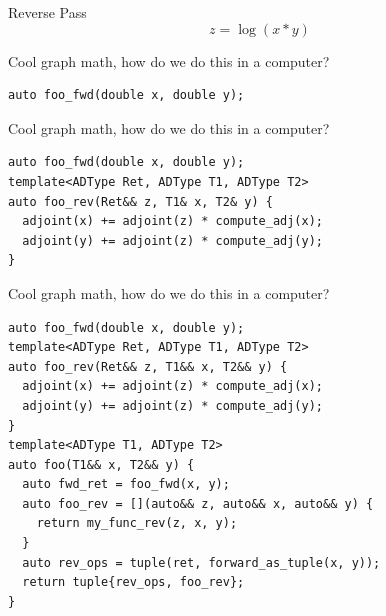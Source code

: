 \documentclass[dvipsnames]{beamer}
\makeatletter
\def\mathcolor#1#{\@mathcolor{#1}}
\def\@mathcolor#1#2#3{%
  \protect\leavevmode
  \begingroup
    \color#1{#2}#3%
  \endgroup
}
\newcommand{\pp}[2]{\frac{\partial#1}{\partial#2}}
\newcommand{\adj}[1]{\bar{#1}}
\makeatother
\begin{document}
\begin{frame}{Reverse Pass}
\vspace{-1mm}
$$z = \log(x*y)$$
\end{frame}


\begin{frame}[fragile]{Cool graph math, how do we do this in a computer?}
\begin{verbatim}
auto foo_fwd(double x, double y);
\end{verbatim}
\end{frame}

\begin{frame}[fragile]{Cool graph math, how do we do this in a computer?}
\begin{verbatim}
auto foo_fwd(double x, double y);
template<ADType Ret, ADType T1, ADType T2>
auto foo_rev(Ret&& z, T1& x, T2& y) {
  adjoint(x) += adjoint(z) * compute_adj(x);
  adjoint(y) += adjoint(z) * compute_adj(y);
}
\end{verbatim}
\end{frame}

\begin{frame}[fragile]{Cool graph math, how do we do this in a computer?}
\begin{verbatim}
auto foo_fwd(double x, double y);
template<ADType Ret, ADType T1, ADType T2>
auto foo_rev(Ret&& z, T1&& x, T2&& y) {
  adjoint(x) += adjoint(z) * compute_adj(x);
  adjoint(y) += adjoint(z) * compute_adj(y);
}
template<ADType T1, ADType T2>
auto foo(T1&& x, T2&& y) {
  auto fwd_ret = foo_fwd(x, y);
  auto foo_rev = [](auto&& z, auto&& x, auto&& y) {
    return my_func_rev(z, x, y);
  }
  auto rev_ops = tuple(ret, forward_as_tuple(x, y));
  return tuple{rev_ops, foo_rev};
}
\end{verbatim}
\end{frame}
\end{document}
